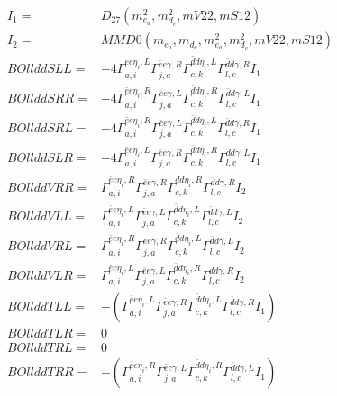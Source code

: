 \documentclass[A4,landscape]{article}
\begin{document}
\begin{align} 
I_1 = & D_{27}(m^2_{e_{{a}}}, m^2_{d_{{c}}}, mV22, mS12) \\ 
I_2 = & MMD0(m_{e_{{a}}}, m_{d_{{c}}}, m^2_{e_{{a}}}, m^2_{d_{{c}}}, mV22, mS12) \\ 
  BOllddSLL= & -4  \Gamma^{\bar{e}e \eta_i ,L}_{a, i} \Gamma^{\bar{e}e \gamma ,R}_{j, a} \Gamma^{\bar{d}d \eta_i ,L}_{c, k} \Gamma^{\bar{d}d \gamma ,R}_{l, c} I_1 \\ 
  BOllddSRR= & -4  \Gamma^{\bar{e}e \eta_i ,R}_{a, i} \Gamma^{\bar{e}e \gamma ,L}_{j, a} \Gamma^{\bar{d}d \eta_i ,R}_{c, k} \Gamma^{\bar{d}d \gamma ,L}_{l, c} I_1 \\ 
  BOllddSRL= & -4  \Gamma^{\bar{e}e \eta_i ,R}_{a, i} \Gamma^{\bar{e}e \gamma ,L}_{j, a} \Gamma^{\bar{d}d \eta_i ,L}_{c, k} \Gamma^{\bar{d}d \gamma ,R}_{l, c} I_1 \\ 
  BOllddSLR= & -4  \Gamma^{\bar{e}e \eta_i ,L}_{a, i} \Gamma^{\bar{e}e \gamma ,R}_{j, a} \Gamma^{\bar{d}d \eta_i ,R}_{c, k} \Gamma^{\bar{d}d \gamma ,L}_{l, c} I_1 \\ 
  BOllddVRR= &  \Gamma^{\bar{e}e \eta_i ,R}_{a, i} \Gamma^{\bar{e}e \gamma ,R}_{j, a} \Gamma^{\bar{d}d \eta_i ,R}_{c, k} \Gamma^{\bar{d}d \gamma ,R}_{l, c} I_2 \\ 
  BOllddVLL= &  \Gamma^{\bar{e}e \eta_i ,L}_{a, i} \Gamma^{\bar{e}e \gamma ,L}_{j, a} \Gamma^{\bar{d}d \eta_i ,L}_{c, k} \Gamma^{\bar{d}d \gamma ,L}_{l, c} I_2 \\ 
  BOllddVRL= &  \Gamma^{\bar{e}e \eta_i ,R}_{a, i} \Gamma^{\bar{e}e \gamma ,R}_{j, a} \Gamma^{\bar{d}d \eta_i ,L}_{c, k} \Gamma^{\bar{d}d \gamma ,L}_{l, c} I_2 \\ 
  BOllddVLR= &  \Gamma^{\bar{e}e \eta_i ,L}_{a, i} \Gamma^{\bar{e}e \gamma ,L}_{j, a} \Gamma^{\bar{d}d \eta_i ,R}_{c, k} \Gamma^{\bar{d}d \gamma ,R}_{l, c} I_2 \\ 
  BOllddTLL= & -( \Gamma^{\bar{e}e \eta_i ,L}_{a, i} \Gamma^{\bar{e}e \gamma ,R}_{j, a} \Gamma^{\bar{d}d \eta_i ,L}_{c, k} \Gamma^{\bar{d}d \gamma ,R}_{l, c} I_1) \\ 
  BOllddTLR= & 0 \\ 
  BOllddTRL= & 0 \\ 
  BOllddTRR= & -( \Gamma^{\bar{e}e \eta_i ,R}_{a, i} \Gamma^{\bar{e}e \gamma ,L}_{j, a} \Gamma^{\bar{d}d \eta_i ,R}_{c, k} \Gamma^{\bar{d}d \gamma ,L}_{l, c} I_1) \\ 
\end{align} 
\end{document}
